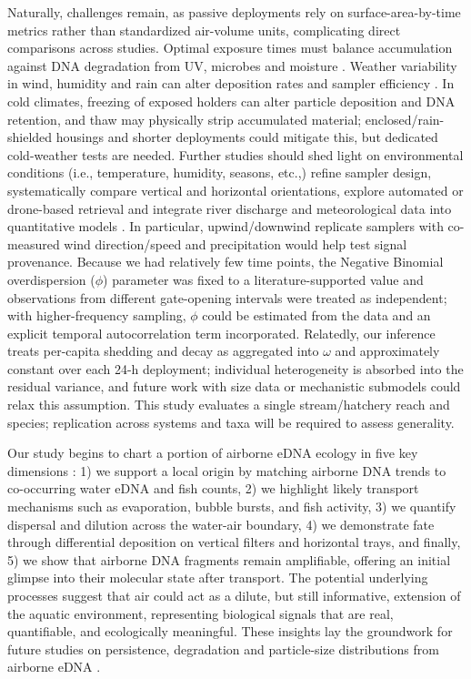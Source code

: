 \documentclass{article}
\begin{document}
Naturally, challenges remain, as passive deployments rely on surface-area-by-time metrics rather than standardized air-volume units, complicating direct comparisons across studies. Optimal exposure times must balance accumulation against DNA degradation from UV, microbes and moisture \cite{brandao-dias2023}. Weather variability in wind, humidity and rain can alter deposition rates and sampler efficiency \cite{johnson2023, johnson2024}. In cold climates, freezing of exposed holders can alter particle deposition and DNA retention, and thaw may physically strip accumulated material; enclosed/rain-shielded housings and shorter deployments could mitigate this, but dedicated cold-weather tests are needed. Further studies should  shed light on environmental conditions (i.e., temperature, humidity, seasons, etc.,) refine sampler design, systematically compare vertical and horizontal orientations, explore automated or drone-based retrieval and integrate river discharge and meteorological data into quantitative models \cite{galban2021, kirchgeorg2024, shogren2017, wood2021}. In particular, upwind/downwind replicate samplers with co-measured wind direction/speed and precipitation would help test signal provenance. Because we had relatively few time points, the Negative Binomial overdispersion ($\phi$) parameter was fixed to a literature-supported value and observations from different gate-opening intervals were treated as independent; with higher-frequency sampling, $\phi$ could be estimated from the data and an explicit temporal autocorrelation term incorporated. Relatedly, our inference treats per-capita shedding and decay as aggregated into $\omega$ and approximately constant over each 24-h deployment; individual heterogeneity is absorbed into the residual variance, and future work with size data or mechanistic submodels could relax this assumption. This study evaluates a single stream/hatchery reach and species; replication across systems and taxa will be required to assess generality.

Our study begins to chart a portion of airborne eDNA ecology in five key dimensions \cite{johnson2024}: 1) we support a local origin by matching airborne DNA trends to co-occurring water eDNA and fish counts, 2) we highlight likely transport mechanisms such as evaporation, bubble bursts, and fish activity, 3) we quantify dispersal and dilution across the water-air boundary, 4) we demonstrate fate through differential deposition on vertical filters and horizontal trays, and finally, 5) we show that airborne DNA fragments remain amplifiable, offering an initial glimpse into their molecular state after transport. The potential underlying processes suggest that air could act as a dilute, but still informative, extension of the aquatic environment, representing biological signals that are real, quantifiable, and ecologically meaningful. These insights lay the groundwork for future studies on persistence, degradation and particle-size distributions from airborne eDNA \cite{brandao-dias2025a}.
\end{document}
